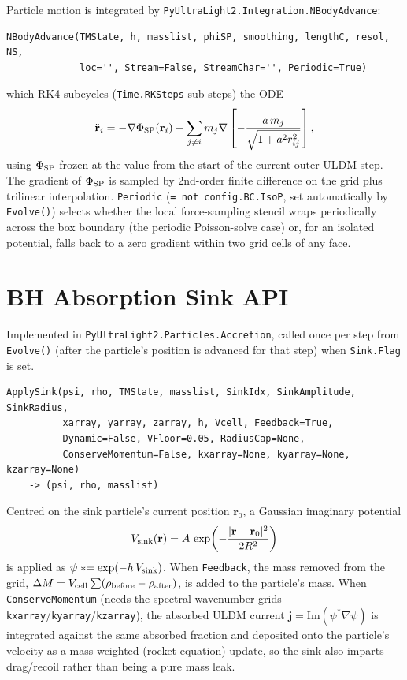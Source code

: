 \documentclass[11pt]{article}
\newcommand{\code}[1]{\texttt{#1}}
\newcommand{\field}[1]{\texttt{#1}}
\begin{document}
Particle motion is integrated by \code{PyUltraLight2.Integration.NBodyAdvance}:
\begin{verbatim}
NBodyAdvance(TMState, h, masslist, phiSP, smoothing, lengthC, resol, NS,
             loc='', Stream=False, StreamChar='', Periodic=True)
\end{verbatim}
which RK4-subcycles (\field{Time.RKSteps} sub-steps) the ODE
\begin{equation}
  \ddot{\mathbf r}_i = -\nabla\Phi_{\rm SP}(\mathbf r_i)
    - \sum_{j\neq i} m_j \nabla\left[-\frac{a\,m_j}{\sqrt{1+a^2 r_{ij}^2}}\right],
\end{equation}
using $\Phi_{\rm SP}$ frozen at the value from the start of the current outer
ULDM step. The gradient of $\Phi_{\rm SP}$ is sampled by 2nd-order finite
difference on the grid plus trilinear interpolation. \field{Periodic}
(\code{= not config.BC.IsoP}, set automatically by \code{Evolve()}) selects
whether the local force-sampling stencil wraps periodically across the box
boundary (the periodic Poisson-solve case) or, for an isolated potential,
falls back to a zero gradient within two grid cells of any face.

\section{BH Absorption Sink API}
\label{sec:sink}

Implemented in \code{PyUltraLight2.Particles.Accretion}, called once per
step from \code{Evolve()} (after the particle's position is advanced for that
step) when \field{Sink.Flag} is set.

\begin{verbatim}
ApplySink(psi, rho, TMState, masslist, SinkIdx, SinkAmplitude, SinkRadius,
          xarray, yarray, zarray, h, Vcell, Feedback=True,
          Dynamic=False, VFloor=0.05, RadiusCap=None,
          ConserveMomentum=False, kxarray=None, kyarray=None, kzarray=None)
    -> (psi, rho, masslist)
\end{verbatim}

Centred on the sink particle's current position $\mathbf r_0$, a Gaussian
imaginary potential
\begin{equation}
  V_{\rm sink}(\mathbf r) = A\,\exp\!\left(-\frac{|\mathbf r-\mathbf r_0|^2}{2R^2}\right)
\end{equation}
is applied as $\psi \mathrel{*}= \exp(-h\,V_{\rm sink})$. When
\field{Feedback}, the mass removed from the grid,
$\Delta M = V_{\rm cell}\sum(\rho_{\rm before}-\rho_{\rm after})$, is added to
the particle's mass. When \field{ConserveMomentum} (needs the spectral
wavenumber grids \field{kxarray}/\field{kyarray}/\field{kzarray}), the
absorbed ULDM current $\mathbf j = \mathrm{Im}(\psi^*\nabla\psi)$ is
integrated against the same absorbed fraction and deposited onto the
particle's velocity as a mass-weighted (rocket-equation) update, so the sink
also imparts drag/recoil rather than being a pure mass leak.
\end{document}
